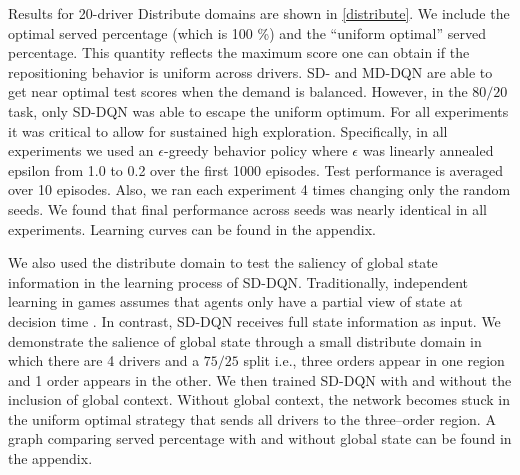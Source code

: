 Results for 20-driver Distribute domains are shown in \cref{distribute}. We include the optimal served percentage (which is 100 \%) and the ``uniform optimal'' served percentage. This quantity reflects the maximum score one can obtain if the repositioning behavior is uniform across drivers. SD- and MD-DQN are able to get near optimal test scores when the demand is balanced. However, in the $80/20$ task, only SD-DQN was able to escape the uniform optimum. For all experiments it was critical to allow for sustained high exploration. Specifically, in all experiments we used an $\epsilon$-greedy behavior policy where $\epsilon$ was linearly annealed epsilon from 1.0 to 0.2 over the first 1000 episodes. Test performance is averaged over 10 episodes. Also, we ran each experiment 4 times changing only the random seeds. We found that final performance across seeds was nearly identical in all experiments. Learning curves can be found in the appendix.

We also used the distribute domain to test the saliency of global state information in the learning process of SD-DQN. Traditionally, independent learning in games assumes that agents only have a partial view of state at decision time \cite{fudenberg1998theory}. In contrast, SD-DQN receives full state information as input. We demonstrate the salience of global state through a small distribute domain in which there are 4 drivers and a $75/25$ split i.e., three orders appear in one region and 1 order appears in the other. We then trained SD-DQN with and without the inclusion of global context. Without global context, the network becomes stuck in the uniform optimal strategy that sends all drivers to the three--order region. A graph comparing served percentage with and without global state can be found in the appendix.

\begin{center}
\begin{table}
\caption{Distribute Domain with 20 Drivers}
\label{distribute}
\end{table}
\end{center}


